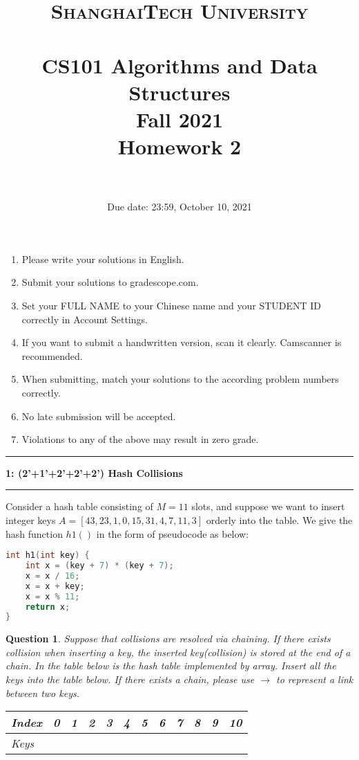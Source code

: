 \documentclass[10.5pt]{article}
\title{
	\normalfont \normalsize
	\textsc{ShanghaiTech University} \\ [25pt]
	\horrule{0.5pt} \\[0.4cm] %
	\huge CS101 Algorithms and Data Structures\\ %
	\LARGE Fall 2021\\
	\LARGE Homework 2\\
	\horrule{2pt} \\[0.5cm] %
}
\author{}
\date{Due date: 23:59, October 10, 2021}
\newcommand\question[2]{\vspace{.25in}\hrule\textbf{#1: #2}\vspace{.5em}\hrule\vspace{.10in}}
\newtheorem{Q}{Question}
\begin{document}
	
	\maketitle
	\thispagestyle{firstpage}
	\vspace{3ex}
	
	\begin{enumerate}
		\item Please write your solutions in English. 
		
		\item Submit your solutions to gradescope.com.  
		
		\item Set your FULL NAME to your Chinese name and your STUDENT ID correctly in Account Settings. 
		
		\item If you want to submit a handwritten version, scan it clearly. Camscanner is recommended. 
		
		\item When submitting, match your solutions to the according problem numbers correctly. 
		
		\item No late submission will be accepted.
		
		\item Violations to any of the above may result in zero grade. 
	\end{enumerate}
	\newpage
	
  \question{1}{(2'+1'+2'+2'+2') Hash Collisions}
    Consider a hash table consisting of $M= 11$ slots, and suppose we want to insert integer keys $A = [43, 23, 1 , 0,15 ,31 ,4 ,7 ,11 ,3]$ orderly into the table. We give the hash function $h1()$ in the form of pseudocode as below:
    
\hrulefill
\rm{
\begin{lstlisting}[language=C++]
int h1(int key) {
	int x = (key + 7) * (key + 7);
	x = x / 16;
	x = x + key;
	x = x % 11;
	return x;
}
\end{lstlisting}
}
\hrulefill
    
\begin{Q} Suppose that collisions are resolved via chaining. If there exists collision when inserting a key, the inserted key(collision) is stored at the end of a chain. In the table below is the hash table implemented by array. Insert all the keys into the table below. If there exists a chain, please use $\rightarrow$
to represent a link between two keys.
\begin{table}[ht]
\begin{tabular}{|l|p{1cm}|p{1cm}|p{1cm}|p{1cm}|p{1cm}|p{1cm}|p{1cm}|p{1cm}|p{1cm}|p{1cm}|p{1cm}|}
\hline
Index & 0&1&2&3&4&5&6&7&8&9&10 \\ \hline
Keys     &&&&&&&&&&&     \\ \hline
\end{tabular}
\end{table}
\end{Q}
\end{document}

